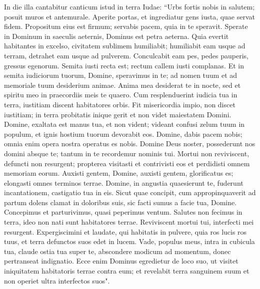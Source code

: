 \begin{biblechapter}  
\verse In die illa cantabitur canticum istud in terra Iudae: “Urbs fortis nobis in salutem; posuit muros et antemurale. 
\verse Aperite portas, et ingrediatur gens iusta, quae servat fidem. 
\verse Propositum eius est firmum; servabis pacem, quia in te speravit. 
\verse Sperate in Dominum in saeculis aeternis, Dominus est petra aeterna. 
\verse Quia evertit habitantes in excelso, civitatem sublimem humiliabit; humiliabit eam usque ad terram, detrahet eam usque ad pulverem. 
\verse Conculcabit eam pes, pedes pauperis, gressus egenorum. 
\verse Semita iusti recta est; rectum callem iusti complanas. 
\verse Et in semita iudiciorum tuorum, Domine, speravimus in te; ad nomen tuum et ad memoriale tuum desiderium animae. 
\verse Anima mea desiderat te in nocte, sed et spiritu meo in praecordiis meis te quaero. Cum resplenduerint iudicia tua in terra, iustitiam discent habitatores orbis. 
\verse Fit misericordia impio, non discet iustitiam; in terra probitatis inique gerit et non videt maiestatem Domini. 
\verse Domine, exaltata est manus tua, et non vident; videant confusi zelum tuum in populum, et ignis hostium tuorum devorabit eos. 
\verse Domine, dabis pacem nobis; omnia enim opera nostra operatus es nobis. 
\verse Domine Deus noster, possederunt nos domini absque te; tantum in te recordemur nominis tui. 
\verse Mortui non reviviscent, defuncti non resurgent; propterea visitasti et contrivisti eos et perdidisti omnem memoriam eorum.  
\verse Auxisti gentem, Domine, auxisti gentem, glorificatus es; elongasti omnes terminos terrae. 
\verse Domine, in angustia quaesierunt te, fuderunt incantationem, castigatio tua in eis. 
\verse Sicut quae concipit, cum appropinquaverit ad partum dolens clamat in doloribus suis, sic facti sumus a facie tua, Domine. 
\verse Concepimus et parturivimus, quasi peperimus ventum. Salutes non fecimus in terra, ideo non nati sunt habitatores terrae. 
\verse Reviviscent mortui tui, interfecti mei resurgent. Expergiscimini et laudate, qui habitatis in pulvere, quia ros lucis ros tuus, et terra defunctos suos edet in lucem. 
\verse Vade, populus meus, intra in cubicula tua, claude ostia tua super te, abscondere modicum ad momentum, donec pertranseat indignatio. 
\verse Ecce enim Dominus egredietur de loco suo, ut visitet iniquitatem habitatoris terrae contra eum; et revelabit terra sanguinem suum et non operiet ultra interfectos suos". 
\end{biblechapter}


